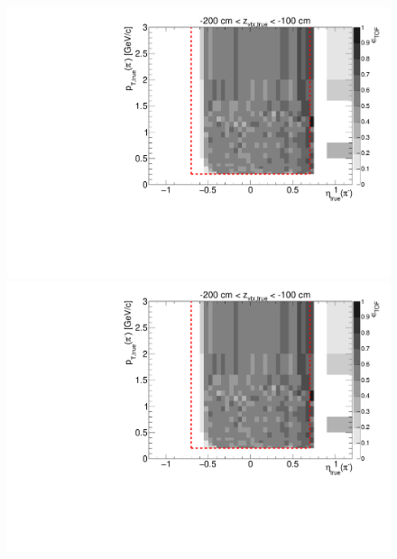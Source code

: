 \begin{figure}[hb]
{  \includegraphics[width=\linewidth,page=16]{graphics/eff/Eff2D_TOF_pion_Minus.pdf}\\
  \includegraphics[width=\linewidth,page=18]{graphics/eff/Eff2D_TOF_pion_Minus.pdf}
}%
\end{figure}


